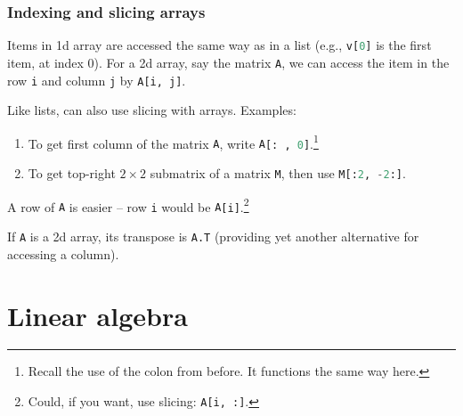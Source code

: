 \documentclass{beamer}
\newenvironment{codeblock}
    {\hfill\begin{beamerboxesrounded}[lower=codecol, width=0.8\textwidth]
    \medskip

    }
    { 
    \end{beamerboxesrounded}\hfill
    }
\theoremstyle{example}
\newcommand{\ct}[1]{\lstinline[language=Python]!#1!}
\newcommand{\ttt}[1]{{\small\texttt{#1}}}
\begin{document}
\begin{frame}
\frametitle{Indexing and slicing arrays}
Items in 1d array are accessed the same way as in a list (e.g., \ttt{v}\ct{[0]} is the first item, at index 0).  For a 2d array, say the matrix \ttt{A}, we can access the item in the row \ct{i} and column \ct{j} by \ttt{A}\ct{[i, j]}.

\vspace*{12pt}
Like lists, can also use slicing with arrays. Examples:
\begin{enumerate}
    \item To get first column of the matrix \ttt{A}, write \ttt{A}\ct{[: , 0]}.\footnote{Recall the use of the colon from before. It functions the same way here.}
    \item To get top-right $2\times 2$ submatrix of a matrix \ttt{M}, then use \ttt{M}\ct{[:2, -2:]}.
\end{enumerate}




A row of \ttt{A} is easier {--} row \ct{i} would be \ttt{A}\ct{[i]}.\footnote{Could, if you want, use slicing: \ttt{A}\ct{[i, :]}.}

If \ttt{A} is a 2d array, its transpose is \ttt{A.T} (providing yet another alternative for accessing a column).
\end{frame}

\section{Linear algebra}
\end{document}
